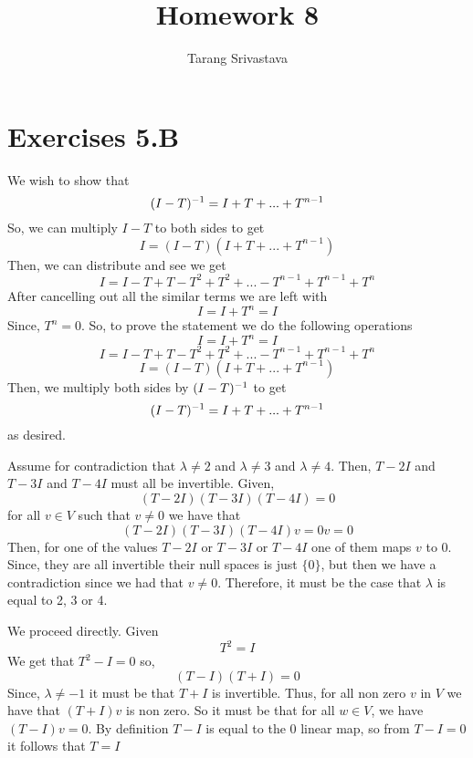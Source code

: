 \documentclass[10pt, twocolumn]{article}
\title{Homework 8}
\author{Tarang Srivastava}
\begin{document}
\makechaptertitle

\section{Exercises 5.B}
\begin{q}[1]
    We wish to show that 
    $$ (I - T)^{-1} = I + T + ... + T^{n - 1} $$
    So, we can multiply $ I - T $ to both sides to get 
    $$ I = (I - T)(I + T + ... + T^{n - 1}) $$
    Then, we can distribute and see we get 
    $$ I = I - T + T - T^2 + T^2 + ... - T^{n-1}  + T^{n-1} + T^{n} $$
    After cancelling out all the similar terms we are left with
    $$ I = I + T^{n} = I $$
    Since, $ T^n = 0 $. 
    So, to prove the statement we do the following operations
    $$ I = I + T^{n} = I $$
    $$ I = I - T + T - T^2 + T^2 + ... - T^{n-1}  + T^{n-1} + T^{n} $$
    $$ I = (I - T)(I + T + ... + T^{n - 1}) $$
    Then, we multiply both sides by $ (I - T)^{-1} $ to get 
    $$ (I - T)^{-1} = I + T + ... + T^{n - 1} $$
    as desired.
\end{q}
\begin{q}[2]
    Assume for contradiction that $ \lambda \neq 2 $ and $\lambda \neq 3 $ and $ \lambda \neq 4 $. 
    Then, $ T - 2I $ and $ T - 3I $ and $ T - 4I $ must all be invertible.
    Given,
    $$ (T - 2I)(T - 3I)(T - 4I) = 0 $$
    for all $ v \in V $ such that $ v \neq 0 $ we have that 
    $$ (T - 2I)(T - 3I)(T - 4I)v = 0v = 0 $$
    Then, for one of the values $ T - 2I $ or $ T - 3I $ or $ T - 4I $ one of them maps $ v $ to 0. 
    Since, they are all invertible their null spaces is just $ \{0\} $, but then we have a contradiction since we had that $ v \neq 0 $.
    Therefore, it must be the case that $ \lambda $ is equal to 2, 3 or 4.
\end{q}
\begin{q}[3]
    We proceed directly. 
    Given
    $$ T^2 = I $$
    We get that $ T^2 - I = 0 $ so, 
    $$ (T - I)(T + I) = 0 $$
    Since, $ \lambda \neq -1 $ it must be that $ T + I $ is invertible. 
    Thus, for all non zero $ v $ in $ V $ we have that $ (T + I)v $ is non zero. 
    So it must be that for all $ w \in V $, we have $ (T - I)v = 0 $.
    By definition $ T - I $ is equal to the 0 linear map, so from $ T - I = 0 $ it follows that
    $ T = I $
\end{q}
\end{document}
